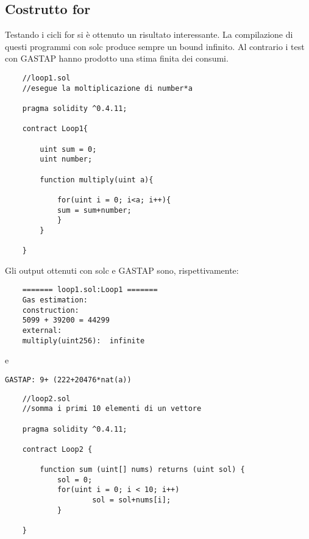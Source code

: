     \subsection{Costrutto for}
    
    Testando i cicli for si è ottenuto un risultato interessante. La compilazione di questi programmi con solc produce sempre un bound infinito. Al contrario i test con GASTAP hanno prodotto una stima finita dei consumi.\newline
    
     
    \begin{minipage}{\linewidth}
    \begin{lstlisting}
    //loop1.sol
    //esegue la moltiplicazione di number*a

    pragma solidity ^0.4.11;

    contract Loop1{

        uint sum = 0;
        uint number;
        
        function multiply(uint a){
            
            for(uint i = 0; i<a; i++){
            sum = sum+number;
            }
        }

    }
    \end{lstlisting}
    \end{minipage}

    
    Gli output ottenuti con solc e GASTAP sono, rispettivamente:
    
    \begin{minipage}{\linewidth}
    \begin{lstlisting}
    ======= loop1.sol:Loop1 =======
    Gas estimation:
    construction:
    5099 + 39200 = 44299
    external:
    multiply(uint256):	infinite
    \end{lstlisting}
    \end{minipage}

    
    e
    
    \verb|GASTAP: 9+ (222+20476*nat(a))|
    
     
    \begin{minipage}{\linewidth}
    \begin{lstlisting}
    //loop2.sol
    //somma i primi 10 elementi di un vettore

    pragma solidity ^0.4.11;

    contract Loop2 {

        function sum (uint[] nums) returns (uint sol) {
            sol = 0;
            for(uint i = 0; i < 10; i++)
                    sol = sol+nums[i];
            }

    }
    \end{lstlisting}
    \end{minipage}

